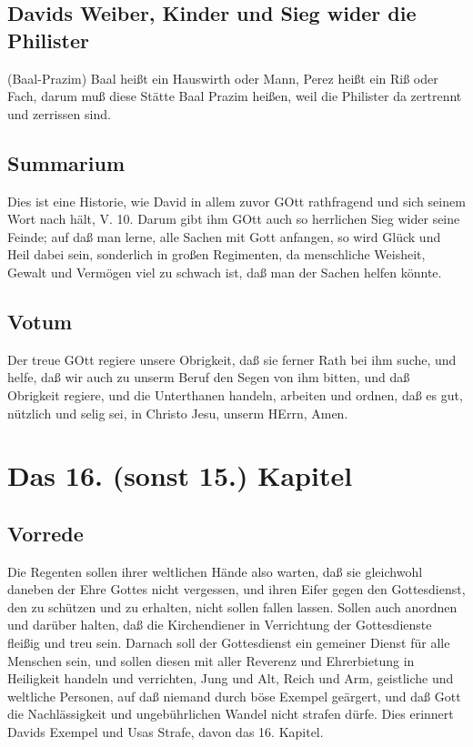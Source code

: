 \section[Davids Weiber, Kinder und Sieg wider die Philister]{Davids Weiber, Kinder und Sieg wider die Philister}
(Baal-Prazim) Baal heißt ein Hauswirth oder Mann, Perez heißt ein Riß oder Fach, darum muß diese Stätte Baal Prazim heißen, weil die Philister da zertrennt und zerrissen sind.

\section{Summarium}

Dies ist eine Historie, wie David in allem zuvor GOtt rathfragend und sich seinem Wort nach hält, V. 10. Darum gibt ihm GOtt auch so herrlichen Sieg wider seine Feinde; auf daß man lerne, alle Sachen mit Gott anfangen, so wird Glück und Heil dabei sein, sonderlich in großen Regimenten, da menschliche Weisheit, Gewalt und Vermögen viel zu schwach ist, daß man der Sachen helfen könnte.

\section{Votum}

Der treue GOtt regiere unsere Obrigkeit, daß sie ferner Rath bei ihm suche, und helfe, daß wir auch zu unserm Beruf den Segen von ihm bitten, und daß Obrigkeit regiere, und die Unterthanen handeln, arbeiten und ordnen, daß es gut, nützlich und selig sei, in Christo Jesu, unserm HErrn, Amen.

\chapter{Das 16. (sonst 15.) Kapitel}

\section{Vorrede}

Die Regenten sollen ihrer weltlichen Hände also warten, daß sie gleichwohl daneben der Ehre Gottes nicht vergessen, und ihren Eifer gegen den Gottesdienst, den zu schützen und zu erhalten, nicht sollen fallen lassen. Sollen auch anordnen und darüber halten, daß die Kirchendiener in Verrichtung der Gottesdienste fleißig und treu sein. Darnach soll der Gottesdienst ein gemeiner Dienst für alle Menschen sein, und sollen diesen mit aller Reverenz und Ehrerbietung in Heiligkeit handeln und verrichten, Jung und Alt, Reich und Arm, geistliche und weltliche Personen, auf daß niemand durch böse Exempel geärgert, und daß Gott die Nachlässigkeit und ungebührlichen Wandel nicht strafen dürfe. Dies erinnert Davids Exempel und Usas Strafe, davon das 16. Kapitel.

